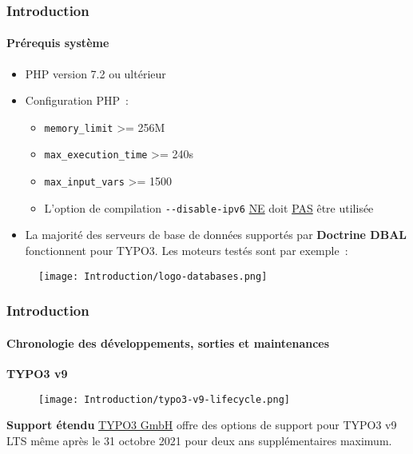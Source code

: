 \begin{frame}[fragile]
	\frametitle{Introduction}
	\framesubtitle{Prérequis système}

	\begin{itemize}
		\item PHP version 7.2 ou ultérieur
		\item Configuration PHP~:

			\begin{itemize}
				\item \texttt{memory\_limit} >= 256M
				\item \texttt{max\_execution\_time} >= 240s
				\item \texttt{max\_input\_vars} >= 1500
				\item L'option de compilation \texttt{-}\texttt{-disable-ipv6} \underline{NE} doit \underline{PAS} être utilisée
			\end{itemize}

		\item La majorité des serveurs de base de données supportés par \textbf{Doctrine DBAL} fonctionnent pour TYPO3.
			Les moteurs testés sont par exemple~:
	\end{itemize}

	\begin{figure}
		\texttt{[image: Introduction/logo-databases.png]}
	\end{figure}

\end{frame}


\begin{frame}[fragile]
	\frametitle{Introduction}
	\framesubtitle{Chronologie des développements, sorties et maintenances}

	\textbf{TYPO3 v9}

	\begin{figure}
		\texttt{[image: Introduction/typo3-v9-lifecycle.png]}
	\end{figure}

	\textbf{Support étendu}\newline
	\smaller
		\href{https://typo3.com}{TYPO3 GmbH} offre des options de support
		pour TYPO3 v9 LTS même après le 31 octobre 2021 pour deux ans
		supplémentaires maximum.
	\normalsize


\end{frame}

